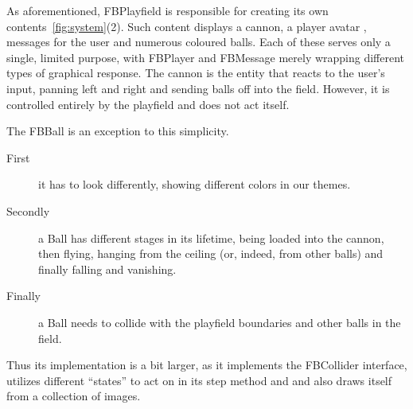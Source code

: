 As aforementioned, FBPlayfield is responsible for creating its own 
contents~\ref{fig:system}(2). Such content displays a cannon, a 
player avatar , messages for the user and numerous coloured balls. 
Each of these serves only a single, limited purpose, with FBPlayer 
and FBMessage merely wrapping different types of graphical response.
The cannon is the entity that reacts to the user's input, panning 
left and right and sending balls off into the field. However, it 
is controlled entirely by the playfield and does not act itself.

The FBBall is an exception to this simplicity. 
\begin{description}
  \item[First]
    	it has to look 
	differently, showing different colors in our themes. 
  \item[Secondly]
    	a Ball has different stages in its lifetime, being 
	loaded into the cannon, then flying, hanging from the 
	ceiling (or, indeed, from other balls) and finally falling 
	and vanishing.
  \item[Finally]
    	a Ball needs to collide with the playfield boundaries and 
	other balls in the field.
\end{description}
%
Thus its implementation is a bit larger, as it implements the FBCollider 
interface, utilizes different ``states'' to act on in its step method and 
and also draws itself from a collection of images.

